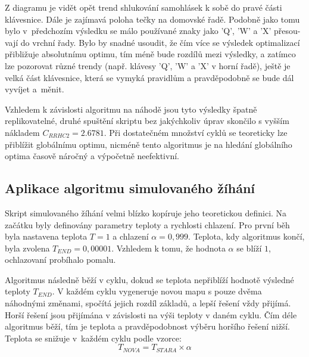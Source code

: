\documentclass[a4paper, twoside, 12pt, czech]{article}
\begin{document}

Z diagramu je vidět opět trend shlukování samohlásek k sobě do pravé části klávesnice. 
Dále je zajímavá poloha tečky na domovské řadě. Podobně jako tomu bylo v~předchozím výsledku 
se málo používané znaky jako 'Q', 'W' a 'X' přesou-vají do vrchní řady. Bylo by snadné usoudit,
že čím více se výsledek optimalizací přibližuje absolutnímu optimu, tím méně bude
rozdílů mezi výsledky, a zatímco lze pozorovat různé trendy (např. klávesy 'Q', 'W' a 'X' v horní řadě),
ještě je velká část klávesnice, která se vymyká pravidlům a pravděpodobně se bude dál vyvíjet 
a~měnit.

Vzhledem k závislosti algoritmu na náhodě jsou tyto výsledky špatně replikovatelné,
druhé spuštění skriptu bez jakýchkoliv úprav skončilo s vyšším nákladem
$C_{RRHC2}=2.6781$. Při dostatečném množství cyklů se teoreticky lze 
přiblížit globálnímu optimu, nicméně tento algoritmus je na hledání globálního 
optima časově náročný a výpočetně neefektivní.

\subsection{Aplikace algoritmu simulovaného žíhání}
Skript simulovaného žíhání velmi blízko kopíruje jeho teoretickou definici. 
Na začátku byly definovány parametry teploty a rychlosti chlazení. Pro první 
běh byla nastavena teplota $T=1$ a chlazení $\alpha=0,999$. Teplota, kdy algoritmus
končí, byla zvolena $T_{END}=0,00001$. Vzhledem k tomu, že 
hodnota $\alpha$ se blíží $1$, ochlazovaní probíhalo pomalu.

Algoritmus následně běží v cyklu, dokud se teplota nepřiblíží hodnotě výsledné 
teploty $T_{END}$. V každém cyklu vygeneruje novou mapu s pouze dvěma náhodnými 
změnami, spočítá jejich rozdíl základů, a lepší řešení vždy přijímá. Horší řešení
jsou přijímána v závislosti na výši teploty v daném cyklu. Čím déle algoritmus 
běží, tím je teplota a pravděpodobnost výběru horšího řešení nižší. Teplota se 
snižuje v~každém cyklu podle vzorce: 
\begin{equation*}
    T_{NOVA}=T_{STARA}\times\alpha
\end{equation*}
\end{document}
